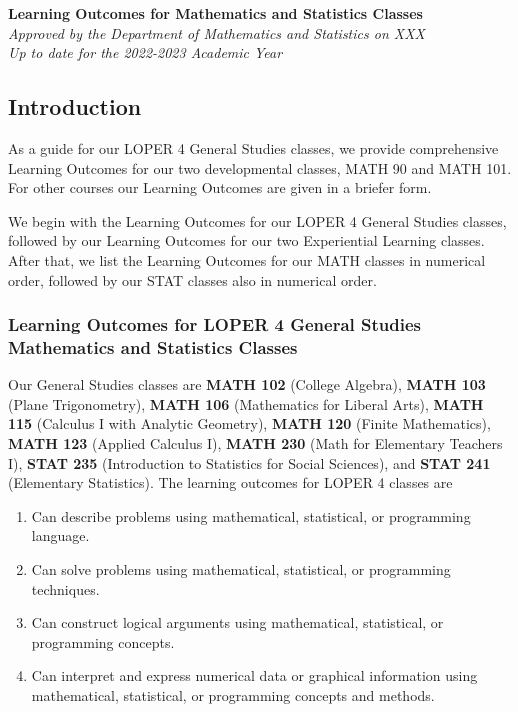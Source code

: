 \documentclass[10pt]{article}
\newenvironment{alphalist}{
\begin{enumerate}[label=(\arabic*),widest=107 ,leftmargin=25pt, itemsep=0pt]}
{\end{enumerate}}
\begin{document}
\begin{flushleft}
    \Large
\textbf{Learning Outcomes for Mathematics and Statistics Classes} \\
\vspace{0.25in}
\normalsize
\emph{Approved by the Department of Mathematics and Statistics on XXX}\\
\emph{Up to date for the 2022-2023 Academic Year}
\end{flushleft}

\subsection*{Introduction}

As a guide for our LOPER  4 General Studies classes, we provide
comprehensive Learning Outcomes  for our two developmental classes, MATH 90
and MATH 101. For other courses our Learning Outcomes are given in a
briefer form.

We begin with the Learning Outcomes for our LOPER  4 General Studies 
classes, followed by our Learning Outcomes for our two Experiential Learning
classes. After that, we list the Learning Outcomes for our MATH classes 
in numerical order, followed by our STAT classes also in numerical order.

\subsubsection*{Learning Outcomes for LOPER  4 General Studies Mathematics and Statistics Classes}

Our General Studies classes are 
\textbf{MATH 102} (College Algebra),
\textbf{MATH 103} (Plane Trigonometry),
\textbf{MATH 106} (Mathematics for Liberal Arts),
\textbf{MATH 115} (Calculus I with Analytic Geometry),
\textbf{MATH 120} (Finite Mathematics),
\textbf{MATH 123} (Applied Calculus I),
\textbf{MATH 230} (Math for Elementary Teachers I),
\textbf{STAT 235} (Introduction to  Statistics for  Social Sciences),
and \textbf{STAT 241}  (Elementary Statistics). The learning outcomes for LOPER  4  classes are

\begin{alphalist}
\item Can describe problems using mathematical, statistical, or programming language.
\item Can solve problems using mathematical, statistical, or programming techniques.
\item Can construct logical arguments using mathematical, statistical, or programming concepts.
\item Can interpret and express numerical data or graphical information using 
   mathematical, statistical, or programming concepts and methods.
\end{alphalist}
\end{document}

